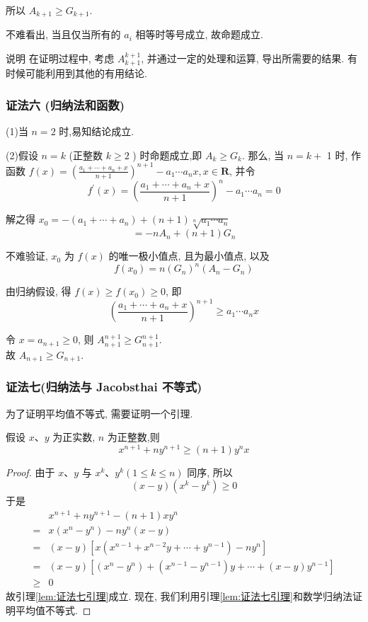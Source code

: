 所以 $A_{k+1} \geqslant G_{k+1}$.

不难看出, 当且仅当所有的 $a_{i}$ 相等时等号成立, 故命题成立.

说明 在证明过程中, 考虑 $A_{k+1}^{k+1}$, 并通过一定的处理和运算, 导出所需要的结果. 有时候可能利用到其他的有用结论.

\subsubsection*{证法六 (归纳法和函数)}

(1)当 $n=2$ 时,易知结论成立.

(2)假设 $n=k$ (正整数 $k \geqslant 2$ ) 时命题成立,即 $A_{k} \geqslant G_{k}$. 那么, 当 $n=k+$ 1 时, 作函数 $f(x)=\left(\frac{a_{1}+\cdots+a_{n}+x}{n+1}\right)^{n+1}-a_{1} \cdots a_{n} x, x \in \mathbf{R}$, 并令
$$
f^{\prime}(x)=\left(\frac{a_{1}+\cdots+a_{n}+x}{n+1}\right)^{n}-a_{1} \cdots a_{n}=0
$$

解之得 $x_{0}=-\left(a_{1}+\cdots+a_{n}\right)+(n+1) \sqrt[n]{a_{1} \cdots a_{n}}$
$$
=-n A_{n}+(n+1) G_{n}
$$

不难验证, $x_{0}$ 为 $f(x)$ 的唯一极小值点, 且为最小值点, 以及
$$
f\left(x_{0}\right)=n\left(G_{n}\right)^{n}\left(A_{n}-G_{n}\right)
$$

由归纳假设, 得 $f(x) \geqslant f\left(x_{0}\right) \geqslant 0$, 即
$$
\left(\frac{a_{1}+\cdots+a_{n}+x}{n+1}\right)^{n+1} \geqslant a_{1} \cdots a_{n} x
$$

令 $x=a_{n+1} \geqslant 0$, 则 $A_{n+1}^{n+1} \geqslant G_{n+1}^{n+1}$.\\
故 $A_{n+1} \geqslant G_{n+1}$.

\subsubsection*{证法七(归纳法与 Jacobsthai 不等式)}

为了证明平均值不等式, 需要证明一个引理.

\begin{lemma}\label{lem:证法七引理}
假设 $x 、 y$ 为正实数, $n$ 为正整数,则
$$
x^{n+1}+n y^{n+1} \geqslant(n+1) y^{n} x
$$
\end{lemma}
\begin{proof}
由于 $x 、 y$ 与 $x^{k} 、 y^{k}(1 \leqslant k \leqslant n)$ 同序, 所以
$$
(x-y)\left(x^{k}-y^{k}\right) \geqslant 0
$$
于是
$$
\begin{aligned}
& x^{n+1}+n y^{n+1}-(n+1) x y^{n} \\
= & x\left(x^{n}-y^{n}\right)-n y^{n}(x-y) \\
= & (x-y)\left[x\left(x^{n-1}+x^{n-2} y+\cdots+y^{n-1}\right)-n y^{n}\right] \\
= & (x-y)\left[\left(x^{n}-y^{n}\right)+\left(x^{n-1}-y^{n-1}\right) y+\cdots+(x-y) y^{n-1}\right] \\
\geqslant & 0
\end{aligned}
$$
故引理\ref{lem:证法七引理}成立. 现在, 我们利用引理\ref{lem:证法七引理}和数学归纳法证明平均值不等式.
\end{proof}

